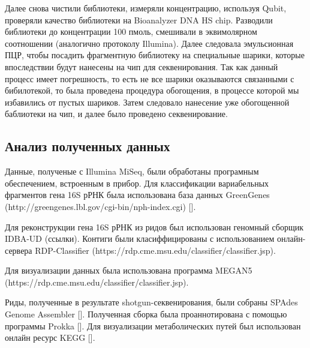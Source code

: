 Далее снова чистили библиотеки, измеряли концентрацию, используя Qubit, проверяли качество библиотеки на Bioanalyzer DNA HS chip. Разводили библиотеки до концентрации 100 пмоль, смешивали в эквимолярном соотношении (аналогично протоколу Illumina). Далее следовала эмульсионная ПЦР, чтобы посадить фрагментную библиотеку на специальные шарики, которые впоследствии будут нанесены на чип для секвенирования. Так как данный процесс имеет погрешность, то есть не все шарики оказываются связанными с бибилотекой, то была проведена процедура обогощения, в процессе которой мы избавились от пустых шариков. Затем следовало нанесение уже обогощенной баблиотеки на чип, и далее было проведено секвенирование. 


\subsection{Анализ полученных данных}  \label{subsect1_2_5}

Данные, полученые с Illumina MiSeq, были обработаны програмным обеспечением, встроенным в прибор. Для классификации вариабельных фрагментов гена 16S рРНК была использована база данных GreenGenes (http://greengenes.lbl.gov/cgi-bin/nph-index.cgi) []. 

Для реконструкции гена 16S рРНК из ридов был использован геномный сборщик IDBA-UD (ссылки). Контиги были класиффицированы с использованием онлайн-сервера RDP-Classifier (https://rdp.cme.msu.edu/classifier/classifier.jsp). 

Для визуализации данных была использована программа MEGAN5 (https://rdp.cme.msu.edu/classifier/classifier.jsp).

Риды, полученные в результате shotgun-секвенирования, были собраны SPAdes Genome Assembler []. Полученная сборка была проаннотирована с помощью программы Prokka []. Для визуализации метаболических путей был использован онлайн ресурс KEGG []. 


\clearpage
